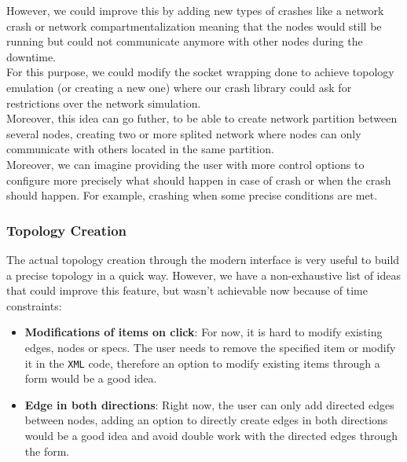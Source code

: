 \documentclass{eplmastersthesis}
\begin{document}
          However, we could improve this by adding new types of crashes like a
          network crash or network compartmentalization meaning that the
          nodes would still be running but could not communicate anymore
          with other nodes during the downtime.\\
          For this purpose, we could modify the socket wrapping done to achieve
          topology emulation (or creating a new one) where our crash library could ask
          for restrictions over the network simulation.\\
          Moreover, this idea can go futher, to be able to create network partition between
          several nodes, creating two or more splited network where nodes can
          only communicate with others located in the same partition.\\

          Moreover, we can imagine providing the user with more control options
          to configure more precisely what should happen in case of crash or
          when the crash should happen. For example, crashing when some
          precise conditions are met.

        \subsubsection{Topology Creation}

          The actual topology creation through the modern interface is very
          useful to build a precise topology in a quick way. However, we have
          a non-exhaustive list of ideas that could improve this feature, but
          wasn't achievable now because of time constraints:

          \begin{itemize}
            \item \textbf{Modifications of items on click}: For now, it is hard
            to modify existing edges, nodes or specs. The user needs to remove
            the specified item or modify it in the \texttt{XML} code, therefore
            an option to modify existing items through a form would be a good
            idea.
            \item \textbf{Edge in both directions}: Right now, the user can only
            add directed edges between nodes, adding an option to directly
            create edges in both directions would be a good idea and
            avoid double work with the directed edges through the form.
          \end{itemize}
\end{document}
